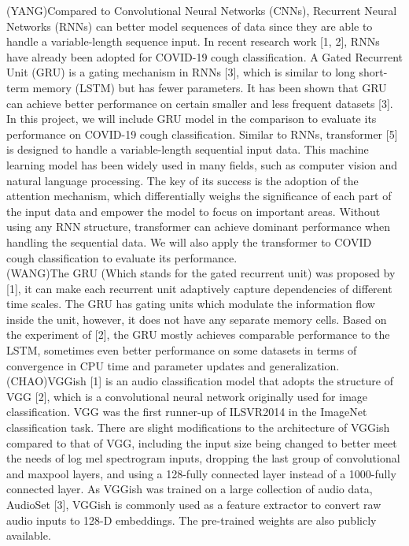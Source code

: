 \documentclass[11pt]{article}
\begin{document}
\noindent
(YANG)Compared to Convolutional Neural Networks (CNNs), Recurrent Neural Networks (RNNs) can better 
model sequences of data since they are able to handle a variable-length sequence input. 
In recent research work [1, 2], RNNs have already been adopted for COVID-19 cough classification. 
A Gated Recurrent Unit (GRU) is a gating mechanism in RNNs [3], which is similar to long 
short-term memory (LSTM) but has fewer parameters. It has been shown that GRU can achieve better 
performance on certain smaller and less frequent datasets [3]. In this project, we will include 
GRU model in the comparison to evaluate its performance on COVID-19 cough classification.
Similar to RNNs, transformer [5] is designed to handle a variable-length sequential input data. 
This machine learning model has been widely used in many fields, such as computer vision and 
natural language processing. The key of its success is the adoption of the attention mechanism, 
which differentially weighs the significance of each part of the input data and empower the model 
to focus on important areas. Without using any RNN structure, transformer can achieve dominant 
performance when handling the sequential data. We will also apply the transformer to COVID cough 
classification to evaluate its performance.\\

\noindent
(WANG)The GRU (Which stands for the gated recurrent unit) was proposed by [1], it can make each recurrent
 unit adaptively capture dependencies of different time scales. The GRU has gating units which 
 modulate the information flow inside the unit, however, it does not have any separate memory cells. 
 Based on the experiment of [2], the GRU mostly achieves comparable performance to the LSTM, sometimes 
 even better performance on some datasets in terms of convergence in CPU time and parameter updates and 
 generalization.\\

 \noindent
(CHAO)VGGish [1] is an audio classification model that adopts the structure of VGG [2], which is a 
convolutional neural network originally used for image classification. VGG was the first runner-up of 
ILSVR2014 in the ImageNet classification task. There are slight modifications to the architecture of 
VGGish compared to that of VGG, including the input size being changed to better meet the needs of 
log mel spectrogram inputs, dropping the last group of convolutional and maxpool layers, and using 
a 128-fully connected layer instead of a 1000-fully connected layer. As VGGish was trained on a large 
collection of audio data, AudioSet [3], VGGish is commonly used as a feature extractor to convert 
raw audio inputs to 128-D embeddings. The pre-trained weights are also publicly available. \\
 
\end{document}
